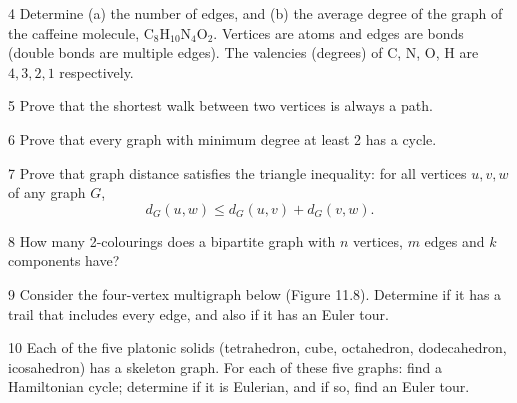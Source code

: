 \begin{exercise}{4}
    Determine (a) the number of edges, and (b) the average degree of the graph
    of the caffeine molecule, $\mathrm C_8\mathrm H_{10}\mathrm N_4\mathrm O_2$.
    Vertices are atoms and edges are bonds (double bonds are multiple edges). The
    valencies (degrees) of C, N, O, H are $4,3,2,1$ respectively.
\end{exercise}

\begin{exercise}{5}
    Prove that the shortest walk between two vertices is always a path.
\end{exercise}

\begin{exercise}{6}
    Prove that every graph with minimum degree at least 2 has a cycle.
\end{exercise}

\begin{exercise}{7}
    Prove that graph distance satisfies the triangle inequality: for all vertices
    $u,v,w$ of any graph $G$,
    \[
        d_G(u,w)\le d_G(u,v)+d_G(v,w).
    \]
\end{exercise}

\begin{exercise}{8}
    How many 2-colourings does a bipartite graph with $n$ vertices, $m$ edges and
    $k$ components have?
\end{exercise}

\begin{exercise}{9}
    Consider the four-vertex multigraph below (Figure 11.8). Determine if it has
    a trail that includes every edge, and also if it has an Euler tour.
    \begin{center}
    \end{center}
\end{exercise}

\begin{exercise}{10}
    Each of the five platonic solids (tetrahedron, cube, octahedron,
    dodecahedron, icosahedron) has a skeleton graph. For each of these five
    graphs: find a Hamiltonian cycle; determine if it is Eulerian, and if so,
    find an Euler tour.
\end{exercise}

